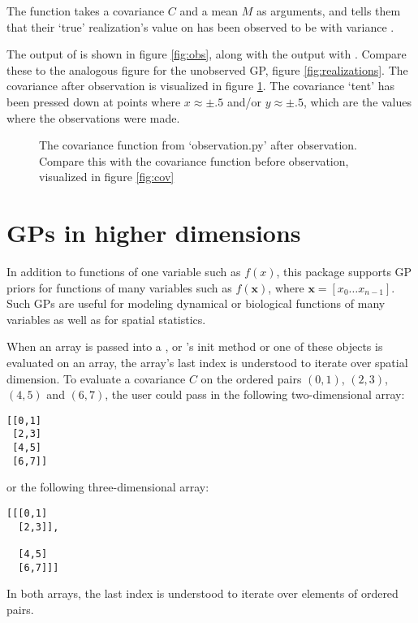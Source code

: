 \documentclass[article]{jss}
\begin{document}
The function  takes a covariance $C$ and a mean $M$ as arguments, and tells them that their `true' realization's value on  has been observed to be  with variance . 

The output of   is shown in figure \ref{fig:obs}, along with the output with . Compare these to the analogous figure for the unobserved GP, figure \ref{fig:realizations}. The covariance after observation is visualized in figure \ref{fig:obscov}. The covariance `tent' has been pressed down at points where $x\approx \pm .5$ and/or $y\approx\pm .5$, which are the values where the observations were made.

\begin{figure}
    \centering
    \caption{The covariance function from {\sffamily `observation.py'} after observation. Compare this with the covariance function before observation, visualized in figure \ref{fig:cov} }
    \label{fig:obscov}
\end{figure}

\section{GPs in higher dimensions}\label{sec:highdim}

In addition to functions of one variable such as $f(x)$, this package supports GP priors for functions of many variables such as $f(\mathbf{x})$, where $\mathbf{x}=[x_0\ldots x_{n-1}]$. Such GPs are useful for modeling dynamical or biological functions of many variables as well as for spatial statistics.

When an array is passed into a ,  or 's init method or one of these objects is evaluated on an array, the array's last index is understood to iterate over spatial dimension. To evaluate a covariance $C$ on the ordered pairs $(0,1)$, $(2,3)$, $(4,5)$ and $(6,7)$, the user could pass in the following two-dimensional  array:
\begin{verbatim}
[[0,1]
 [2,3]
 [4,5]
 [6,7]]
\end{verbatim}
or the following three-dimensional array:
\begin{verbatim}
[[[0,1]
  [2,3]],

  [4,5]
  [6,7]]]
\end{verbatim}
In both arrays, the last index is understood to iterate over elements of ordered pairs.
\end{document}
